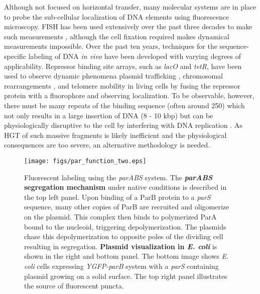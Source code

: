 Although not focused on horizontal transfer, many molecular systems are in place
to  probe the sub-cellular localization of DNA elements using fluorescence
microscopy. FISH has been used extensively
over the past three decades to make such measurements \cite{Levsky:2003bz},
although the cell fixation required makes dynamical measurements impossible.
Over the past ten years, techniques for the sequence-specific labeling of DNA
\textit{in vivo} have been developed with varying degrees of applicability.
Repressor binding site arrays, such as \textit{lacO} and \textit{tetR}, have
been used to observe dynamic phenomena plasmid trafficking \cite{Ho:1911wf},
chromosomal rearrangements \cite{Lau:2004bp}, and telomere
mobility \cite{Jegou:2009kb} in living cells by fusing the repressor protein with
a fluorophore and observing localization. To be observable, however, there must
be many repeats of the binding sequence (often around 250) which not only
results in a large insertion of DNA (8 - 10 kbp) but can be physiologically
disruptive to the cell by interfering with DNA replication \cite{Dubarry:2011bx,
Payne:2006fc}. As HGT of such massive fragments is likely inefficient and the
physiological consequences are too severe, an alternative methodology is needed.

\begin{figure}

	\centerline{\texttt{[image: figs/par\_function\_two.eps]}}

	\caption{Fluorescent labeling using the \textit{parABS} system. The {\bf
		\textit{parABS} segregation mechanism} under native conditions
		is described in the top left panel. Upon binding of a ParB protein 
		to a \textit{parS} sequence, many other copies of ParB are
		recruited and oligomerize on the plasmid. This complex then
		binds to polymerized ParA bound to the nucleoid, triggering
		depolymerization. The plasmids chase this depolymerization to
		opposite poles of the dividing cell resulting in segregation.
		{\bf Plasmid visualization in \textit{E. coli}} is shown in the
		right and bottom panel. The bottom image shows \textit{E. coli}
		cells expressing \textit{YGFP-parB} system with a \textit{parS}
	containing plasmid growing on a solid surface. The top right panel
illustrates the source of fluorescent puncta.} 
		
		\label{fig:par_system}
\end{figure}

